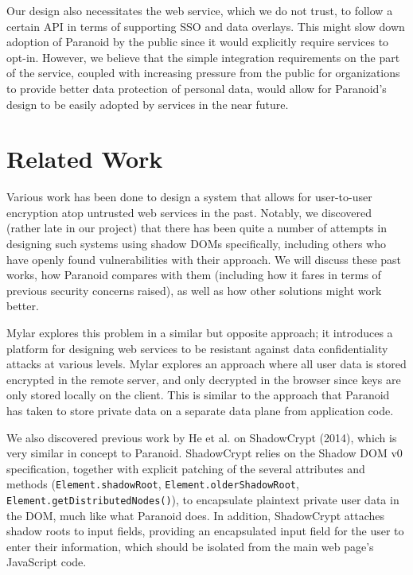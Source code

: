 \documentclass[letterpaper,twocolumn,10pt]{article}
\begin{document}
Our design also necessitates the web service, which we do not trust, to follow a certain API in terms of supporting SSO and data overlays. This might slow down adoption of Paranoid by the public since it would explicitly require services to opt-in. However, we believe that the simple integration requirements on the part of the service, coupled with increasing pressure from the public for organizations to provide better data protection of personal data, would allow for Paranoid's design to be easily adopted by services in the near future.

\section{Related Work}

Various work has been done to design a system that allows for user-to-user encryption atop untrusted web services in the past. Notably, we discovered (rather late in our project) that there has been quite a number of attempts in designing such systems using shadow DOMs specifically, including others who have openly found vulnerabilities with their approach. We will discuss these past works, how Paranoid compares with them (including how it fares in terms of previous security concerns raised), as well as how other solutions might work better.

Mylar \cite{Popa:2014:BWA:2616448.2616464} explores this problem in a similar but opposite approach; it introduces a platform for designing web services to be resistant against data confidentiality attacks at various levels. Mylar explores an approach where all user data is stored encrypted in the remote server, and only decrypted in the browser since keys are only stored locally on the client. This is similar to the approach that Paranoid has taken to store private data on a separate data plane from application code.

We also discovered previous work by He et al. \cite{He:2014:SEW:2660267.2660326} on ShadowCrypt (2014), which is very similar in concept to Paranoid. ShadowCrypt relies on the Shadow DOM v0 specification, together with explicit patching of the several attributes and methods (\texttt{Element.shadowRoot}, \texttt{Element.olderShadowRoot}, \texttt{Element.getDistributedNodes()}), to encapsulate plaintext private user data in the DOM, much like what Paranoid does. In addition, ShadowCrypt attaches shadow roots to input fields, providing an encapsulated input field for the user to enter their information, which should be isolated from the main web page's JavaScript code.
\end{document}
